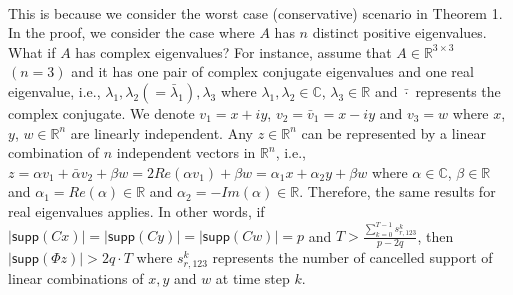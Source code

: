 \documentclass[twocolumn]{autart}    %
\newcommand{\qie}[1]{{\normalsize{{{\color{magenta}#1}}}}}
\begin{document}
\\
This is because we consider the worst case (conservative) scenario in Theorem 1. 
In the proof, we consider the case where $A$ has $n$ distinct positive eigenvalues. What if $A$ has complex eigenvalues? For instance, assume that $A \in \mathbb{R}^{3\times 3}$ $(n=3)$ and it has one pair of complex conjugate eigenvalues and one real eigenvalue, i.e., $\lambda_1, \lambda_2 (= \bar \lambda_1), \lambda_3$ where $\lambda_1, \lambda_2 \in \mathbb{C}$, $\lambda_3 \in \mathbb{R}$ and $\bar \cdot$ represents the complex conjugate. We denote $v_1 = x+ i y$, $v_2 = \bar v_1 = x - i y$ and $v_3 = w$ where $x$, $y$, $w  \in \mathbb{R}^n $ are linearly independent. Any $z \in \mathbb{R}^n$ can be represented by a linear combination of $n$ independent vectors in $\mathbb{R}^n$, i.e., $z = \alpha v_1 + \bar \alpha  v_2 + \beta w  = 2 Re( \alpha v_1) + \beta w =  \alpha_1 x + \alpha _2 y + \beta w$ where $\alpha \in \mathbb{C}$, $\beta \in \mathbb{R}$ and $\alpha_1 = Re(\alpha)\in \mathbb{R}$ and $\alpha_2 = - Im(\alpha) \in \mathbb{R}$. Therefore, the same results for real eigenvalues applies. In other words, if $ \lvert \textsf{supp}( C x) \rvert = \lvert \textsf{supp}( C y) \rvert = \lvert \textsf{supp}( C w) \rvert = p$ and $T > \frac { \sum_{k=0}^{T-1} s_{r,123}^k} {p - 2q}$, then $\lvert \textsf{supp} (\Phi z) \rvert > 2 q \cdot T$ where $s_{r,123}^k $ represents the number of cancelled support of linear combinations of $x,y$ and $w$ at time step $k$.
\end{document}
